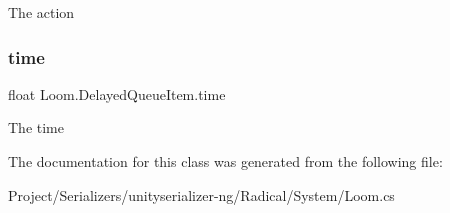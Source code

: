 The action 

\mbox{\label{class_loom_1_1_delayed_queue_item_a31169962a9fc37e848515f0c6552c9ea}} 
\subsubsection{\texorpdfstring{time}{time}}
{\footnotesize\ttfamily float Loom.\+Delayed\+Queue\+Item.\+time}



The time 



The documentation for this class was generated from the following file\+:\begin{DoxyCompactItemize}
\item 
Project/\+Serializers/unityserializer-\/ng/\+Radical/\+System/Loom.\+cs\end{DoxyCompactItemize}

